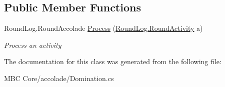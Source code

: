\subsection*{Public Member Functions}
\begin{DoxyCompactItemize}
\item 
\hypertarget{class_m_b_c_1_1_core_1_1mbc_1_1accolade_1_1_domination_a040a6f1da35856d780a747414a0cd632}{Round\-Log.\-Round\-Accolade \hyperlink{class_m_b_c_1_1_core_1_1mbc_1_1accolade_1_1_domination_a040a6f1da35856d780a747414a0cd632}{Process} (\hyperlink{class_m_b_c_1_1_core_1_1_round_log_1_1_round_activity}{Round\-Log.\-Round\-Activity} a)}\label{class_m_b_c_1_1_core_1_1mbc_1_1accolade_1_1_domination_a040a6f1da35856d780a747414a0cd632}

\begin{DoxyCompactList}\small\item\em Process an activity\end{DoxyCompactList}\end{DoxyCompactItemize}


The documentation for this class was generated from the following file\-:\begin{DoxyCompactItemize}
\item 
M\-B\-C Core/accolade/Domination.\-cs\end{DoxyCompactItemize}
